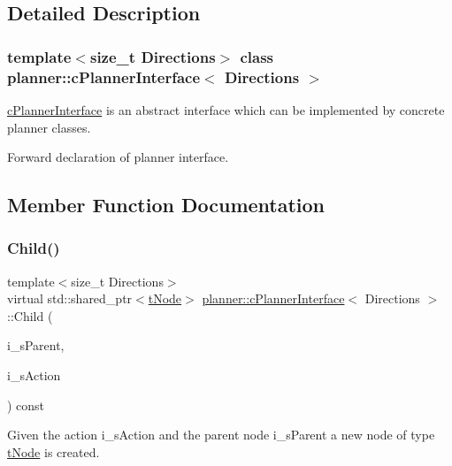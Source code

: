 \subsection{Detailed Description}
\subsubsection*{template$<$size\+\_\+t Directions$>$\newline
class planner\+::c\+Planner\+Interface$<$ Directions $>$}

\mbox{\hyperlink{classplanner_1_1c_planner_interface}{c\+Planner\+Interface}} is an abstract interface which can be implemented by concrete planner classes. 

Forward declaration of planner interface. 

\subsection{Member Function Documentation}
\mbox{\label{classplanner_1_1c_planner_interface_a7e2048c2a4c699a76db90d1cbfecf156}} 
\subsubsection{\texorpdfstring{Child()}{Child()}\hspace{0.1cm}{\footnotesize\ttfamily [1/2]}}
{\footnotesize\ttfamily template$<$size\+\_\+t Directions$>$ \\
virtual std\+::shared\+\_\+ptr$<$\mbox{\hyperlink{structplanner_1_1t_node}{t\+Node}}$>$ \mbox{\hyperlink{classplanner_1_1c_planner_interface}{planner\+::c\+Planner\+Interface}}$<$ Directions $>$\+::Child (\begin{DoxyParamCaption}\item[{std\+::shared\+\_\+ptr$<$ \mbox{\hyperlink{structplanner_1_1t_node}{t\+Node}} $>$ \&}]{i\+\_\+s\+Parent,  }\item[{const \mbox{\hyperlink{structplanner_1_1t_action}{t\+Action}} \&}]{i\+\_\+s\+Action }\end{DoxyParamCaption}) const\hspace{0.3cm}{\ttfamily [pure virtual]}}



Given the action i\+\_\+s\+Action and the parent node i\+\_\+s\+Parent a new node of type \mbox{\hyperlink{structplanner_1_1t_node}{t\+Node}} is created. 

